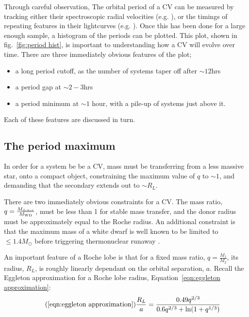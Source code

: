 Through careful observation, The orbital period of a CV can be measured by tracking either their spectroscopic radial velocities (e.g. \citealt{gaensicke2009}), or the timings of repeating features in their lightcurves (e.g. \citealt{Littlefair2008}). Once this has been done for a large enough sample, a histogram of the periods can be plotted. This plot, shown in fig.~\ref{fig:period hist}, is important to understanding how a CV will evolve over time.
There are three immediately obvious features of the plot;
\begin{itemize}
    \item a long period cutoff, as the number of systems taper off after $\sim12$hrs
    \item a period gap at $\sim2-3$hrs
    \item a period minimum at $\sim1$ hour, with a pile-up of systems just above it.
\end{itemize}
Each of these features are discussed in turn.

\subsection{The period maximum}
\label{sect:introduction:period maximum}
In order for a system be be a CV, mass must be transferring from a less massive star, onto a compact object, constraining the maximum value of $q$ to $\sim1$, and demanding that the secondary extends out to $\sim R_L$. 

There are two immediately obvious constraints for a CV. The mass ratio, $q = \frac{M_{\rm donor}}{M_{\rm WD}}$, must be less than 1 for stable mass transfer, and the donor radius must be approximately equal to the Roche radius.
An additional constraint is that the maximum mass of a white dwarf is well known to be limited to $\le 1.4M_{\odot}$ before triggering thermonuclear runaway \citep{chandrasekhar1942}.

An important feature of a Roche lobe is that for a fixed mass ratio, $q=\frac{M_1}{M_2}$, its radius, $R_L$, is roughly linearly dependant on the orbital separation, $a$. Recall the Eggleton approximation for a Roche lobe radius, Equation~\ref{eqn:eggleton approximation}:
\begin{equation}
    \tag{\ref{eqn:eggleton approximation}}
    \frac{R_L}{a} = \frac{0.49 q^{2/3}}{0.6 q^{2/3} + \mathrm{ln}(1 + q^{1/3})}
\end{equation}

